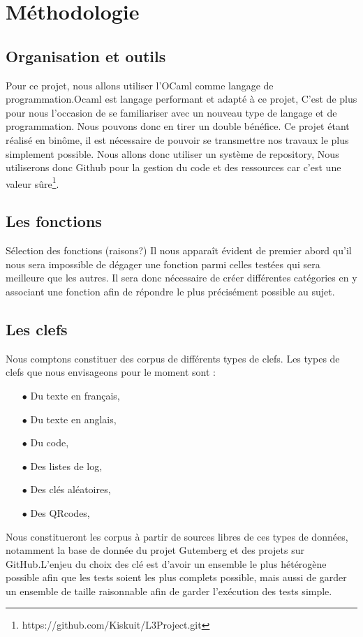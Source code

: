\documentclass[final,twoside,twocolumn,10pt]{scrartcl}
\begin{document}
	
\section{Méthodologie}
	\subsection{Organisation et outils}
		Pour ce projet, nous allons utiliser l'OCaml comme langage de programmation.Ocaml est langage performant et 	adapté à ce projet, C’est de plus pour nous l’occasion de se familiariser avec un nouveau type de langage et de 	programmation. Nous pouvons donc en tirer un double bénéfice.
	Ce projet étant réalisé en binôme, il est nécessaire de pouvoir se transmettre nos travaux le plus simplement possible. Nous allons donc utiliser un système de \“repository\”, Nous utiliserons donc Github pour la gestion du code et des ressources car c'est une valeur sûre\footnote{https://github.com/Kiskuit/L3Project.git}.
		
	\subsection{Les fonctions}
		Sélection des fonctions (raisons?)
		Il nous apparaît évident de premier abord qu’il nous sera impossible de dégager une fonction parmi celles testées qui sera meilleure que les autres. Il sera donc nécessaire de créer différentes catégories en y associant une fonction afin de répondre le plus précisément possible au sujet.
		
	\subsection{Les clefs}
		Nous comptons constituer des corpus de différents types de clefs. Les types de clefs que nous envisageons pour le moment sont :
		\begin{itemize}
			\item[$\bullet$]Du texte en français,
			\item[$\bullet$]Du texte en anglais,
			\item[$\bullet$]Du code,
			\item[$\bullet$]Des listes de log,
			\item[$\bullet$]Des clés aléatoires,
			\item[$\bullet$]Des QRcodes,
		\end{itemize}
		Nous constitueront les corpus à partir de sources libres de ces types de données, notamment la base de donnée du projet Gutemberg et des projets sur GitHub.L’enjeu du choix des clé est d’avoir un ensemble le plus hétérogène possible afin que les tests soient les plus complets possible, mais aussi de garder un ensemble de taille raisonnable afin de garder l'exécution des tests simple.
		
\end{document}
